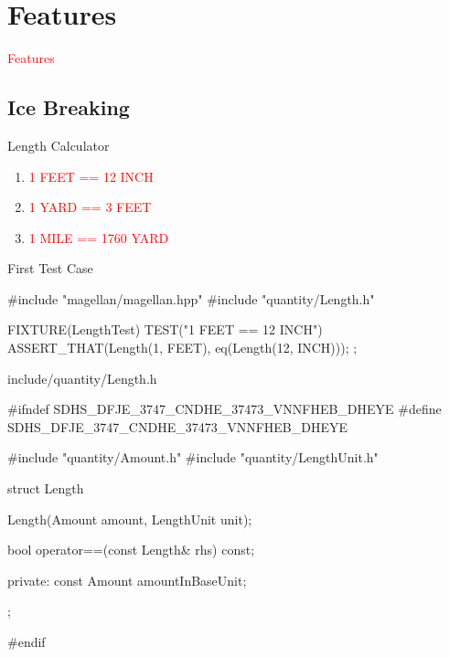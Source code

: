 \section{Features}
\label{sec:features}

\begin{frame}
  \begin{center}
    \Huge{\textcolor{red}{Features}}
  \end{center}
\end{frame}

\subsection{Ice Breaking}

\begin{frame}{Length Calculator}
  \begin{enumerate}
    \item \textcolor{red}{1 FEET == 12 INCH}
    \item \textcolor{red}{1 YARD == 3 FEET}
    \item \textcolor{red}{1 MILE == 1760 YARD}
  \end{enumerate}
\end{frame}

\begin{frame}[fragile]{First Test Case}
\begin{c++}
#include "magellan/magellan.hpp"
#include "quantity/Length.h"

FIXTURE(LengthTest)
{
    TEST("1 FEET == 12 INCH")
    {
        ASSERT_THAT(Length(1, FEET), eq(Length(12, INCH)));
    }
};
\end{c++}
\end{frame}

\begin{frame}[fragile]{include/quantity/Length.h}
\begin{c++}
#ifndef SDHS_DFJE_3747_CNDHE_37473_VNNFHEB_DHEYE
#define SDHS_DFJE_3747_CNDHE_37473_VNNFHEB_DHEYE

#include "quantity/Amount.h"
#include "quantity/LengthUnit.h"

struct Length
{
    Length(Amount amount, LengthUnit unit);

    bool operator==(const Length& rhs) const;

private:
    const Amount amountInBaseUnit;
};

#endif
\end{c++}
\end{frame}

